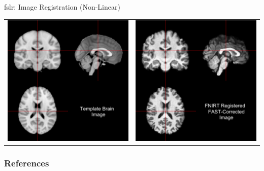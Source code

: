\documentclass[11pt]{beamer}\usepackage[]{graphicx}\usepackage[]{color}
\begin{document}
\begin{frame}[fragile]{fslr: Image Registration (Non-Linear)}

\begin{tabular}{cc}
\includegraphics[width=0.5\linewidth]{Template_Brain.png} & \includegraphics[width=0.5\linewidth]{FNIRT_Reg_Image.png}
\end{tabular}

\end{frame}



\begin{frame}[t,allowframebreaks]
\frametitle{References}
\printbibliography
\end{frame}
\end{document}
